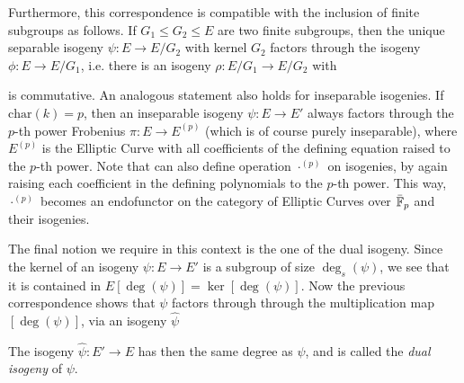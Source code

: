 Furthermore, this correspondence is compatible with the inclusion of finite subgroups as follows.
If $G_1 \leq G_2 \leq E$ are two finite subgroups, then the unique separable isogeny $\psi: E \to E/G_2$ with kernel $G_2$ factors through the isogeny $\phi: E \to E/G_1$, i.e. there is an isogeny $\rho: E/G_1 \to E/G_2$ with
\begin{center}
\end{center}
is commutative.
An analogous statement also holds for inseparable isogenies.
If $\mathrm{char}(k) = p$, then an inseparable isogeny $\psi: E \to E'$ always factors through the $p$-th power Frobenius $\pi: E \to E^{(p)}$ (which is of course purely inseparable), where $E^{(p)}$ is the Elliptic Curve with all coefficients of the defining equation raised to the $p$-th power.
Note that can also define operation $\cdot^{(p)}$ on isogenies, by again raising each coefficient in the defining polynomials to the $p$-th power.
This way, $\cdot^{(p)}$ becomes an endofunctor on the category of Elliptic Curves over $\bar{\mathbb{F}}_p$ and their isogenies.

The final notion we require in this context is the one of the dual isogeny.
Since the kernel of an isogeny $\psi: E \to E'$ is a subgroup of size $\deg_s(\psi)$, we see that it is contained in $E[\deg(\psi)] = \ker[\deg(\psi)]$.
Now the previous correspondence shows that $\psi$ factors through through the multiplication map $[\deg(\psi)]$, via an isogeny $\hat{\psi}$
\begin{center}
\end{center}
The isogeny $\hat{\psi}: E' \to E$ has then the same degree as $\psi$, and is called the \emph{dual isogeny} of $\psi$.

